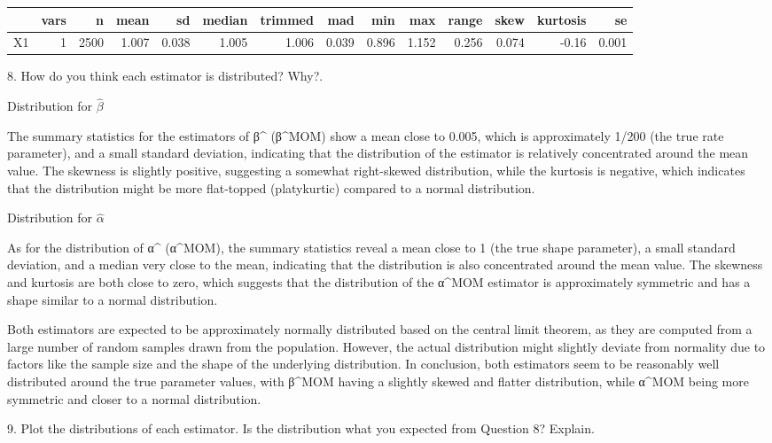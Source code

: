 \documentclass[
]{article}
\begin{document}
\begin{table}
\centering
\begin{tabular}{l|r|r|r|r|r|r|r|r|r|r|r|r|r}
\hline
  & vars & n & mean & sd & median & trimmed & mad & min & max & range & skew & kurtosis & se\\
\hline
X1 & 1 & 2500 & 1.007 & 0.038 & 1.005 & 1.006 & 0.039 & 0.896 & 1.152 & 0.256 & 0.074 & -0.16 & 0.001\\
\hline
\end{tabular}
\end{table}

{ 8. How do you think each estimator is distributed? Why?}.

Distribution for \(\hat{\beta}\)

The summary statistics for the estimators of β\^{} (β\^{}MOM) show a
mean close to 0.005, which is approximately 1/200 (the true rate
parameter), and a small standard deviation, indicating that the
distribution of the estimator is relatively concentrated around the mean
value. The skewness is slightly positive, suggesting a somewhat
right-skewed distribution, while the kurtosis is negative, which
indicates that the distribution might be more flat-topped (platykurtic)
compared to a normal distribution.

Distribution for \(\hat{\alpha}\)

As for the distribution of α\^{} (α\^{}MOM), the summary statistics
reveal a mean close to 1 (the true shape parameter), a small standard
deviation, and a median very close to the mean, indicating that the
distribution is also concentrated around the mean value. The skewness
and kurtosis are both close to zero, which suggests that the
distribution of the α\^{}MOM estimator is approximately symmetric and
has a shape similar to a normal distribution.

Both estimators are expected to be approximately normally distributed
based on the central limit theorem, as they are computed from a large
number of random samples drawn from the population. However, the actual
distribution might slightly deviate from normality due to factors like
the sample size and the shape of the underlying distribution. In
conclusion, both estimators seem to be reasonably well distributed
around the true parameter values, with β\^{}MOM having a slightly skewed
and flatter distribution, while α\^{}MOM being more symmetric and closer
to a normal distribution.

{ 9. Plot the distributions of each estimator. Is the distribution what
you expected from Question 8? Explain. }
\end{document}
